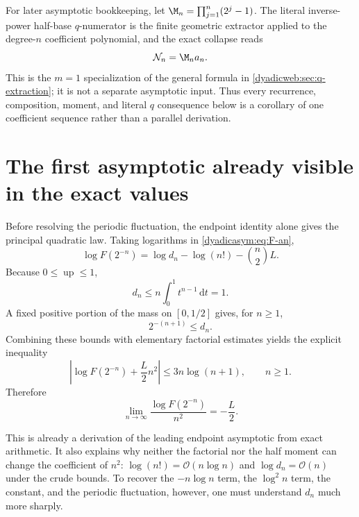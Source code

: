 \documentclass[11pt,oneside]{article}
\theoremstyle{definition}
\theoremstyle{remark}
\newcommand{\Up}{\operatorname{up}}
\newcommand{\dd}{\,\mathrm d}
\newcommand{\bigO}{\mathcal O}
\begin{document}
For later asymptotic bookkeeping, let
\(\M_n=\prod_{j=1}^n(2^j-1)\).  The literal inverse-power half-base
$q$-numerator is the finite geometric extractor applied to the degree-$n$ coefficient
polynomial, and the exact collapse reads
\begin{equation}
 \mathcal N_n=\M_na_n.                                    \label{dyadicasym:eq:N-m-a}
\end{equation}
This is the $m=1$ specialization of the general formula in
\cref{dyadicweb:sec:q-extraction}; it is not a separate asymptotic input.  Thus every
recurrence, composition, moment, and literal $q$ consequence below is a corollary of one
coefficient sequence rather than a parallel derivation.

\section{The first asymptotic already visible in the exact values}
\label{dyadicasym:sec:coarse}

Before resolving the periodic fluctuation, the endpoint identity alone gives the principal
quadratic law.  Taking logarithms in \eqref{dyadicasym:eq:F-an},
\begin{equation}
 \log F(2^{-n})=\log d_n-\log(n!)-\binom n2L.               \label{dyadicasym:eq:log-F-exact}
\end{equation}
Because $0\le\Up\le1$,
\begin{equation}
 d_n\le n\int_0^1t^{n-1}\dd t=1.                           \label{dyadicasym:eq:dn-upper}
\end{equation}
A fixed positive portion of the mass on $[0,1/2]$ gives, for $n\ge1$,
\begin{equation}
 2^{-(n+1)}\le d_n.                                         \label{dyadicasym:eq:dn-lower}
\end{equation}
Combining these bounds with elementary factorial estimates yields the explicit inequality
\begin{equation}
 \left|\log F(2^{-n})+\frac L2n^2\right|
 \le3n\log(n+1),\qquad n\ge1.                              \label{dyadicasym:eq:coarse-bound}
\end{equation}
Therefore
\begin{equation}
 \lim_{n\to\infty}\frac{\log F(2^{-n})}{n^2}=-\frac L2.    \label{dyadicasym:eq:coarse-limit}
\end{equation}

This is already a derivation of the leading endpoint asymptotic from exact arithmetic.  It
also explains why neither the factorial nor the half moment can change the coefficient of
$n^2$: $\log(n!)=\bigO(n\log n)$ and $\log d_n=\bigO(n)$ under the crude bounds.  To recover
the $-n\log n$ term, the $\log^2n$ term, the constant, and the periodic fluctuation, however,
one must understand $d_n$ much more sharply.
\end{document}

